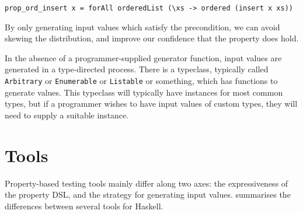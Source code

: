 \begin{verbatim}
prop_ord_insert x = forAll orderedList (\xs -> ordered (insert x xs))
\end{verbatim}

By only generating input values which satisfy the precondition, we can avoid
skewing the distribution, and improve our confidence that the property does
hold.

In the absence of a programmer-supplied generator function, input values are
generated in a type-directed process.  There is a typeclass, typically called
\verb|Arbitrary| or \verb|Enumerable| or \verb|Listable| or something, which has
functions to generate values.  This typeclass will typically have instances for
most common types, but if a programmer wishes to have input values of custom
types, they will need to supply a suitable instance.

\section{Tools}
\label{sec:property_testing-tools}

Property-based testing tools mainly differ along two axes: the
expressiveness of the property DSL, and the strategy for generating
input values.   summarises the differences between
several tools for Haskell.

\begingroup
\newcommand{\Y}{\CIRCLE}
\newcommand{\N}{\Circle}
\newcommand{\YN}{\LEFTcircle}
\newcommand{\Q}{\N$^p$}
\newcommand{\VBS}{\rotatebox{90}{\scriptsize BSD3}}
\newcommand{\VGP}{\rotatebox{90}{\scriptsize GPLv3}}

